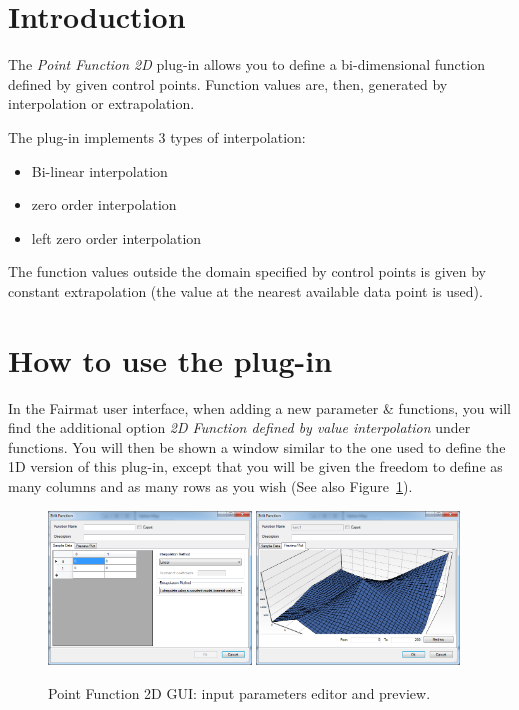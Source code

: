 \newcommand{\pluginName}{Point Function 2D}
\newcommand{\pluginVersion}{1.0.2}



\section{Introduction}
The \emph{Point Function 2D} plug-in allows you to define a bi-dimensional function defined by given control points. Function values are, then, generated by interpolation or extrapolation.

The plug-in implements 3 types of interpolation:
\begin{itemize}
\item Bi-linear interpolation
\item zero order interpolation
\item left zero order interpolation
\end{itemize}

The function values outside the domain specified by control points is given by constant extrapolation (the value at the nearest available data point is used).

\section{How to use the plug-in}
In the Fairmat user interface, when adding a new parameter \& functions, you will find the additional option \emph{2D Function defined by value interpolation} under functions.
You will then be shown a window similar to the one used to define the 1D version of this plug-in, except that you will be given the freedom to define as many columns and as many rows as you wish (See also Figure~\ref{fig.PFunction2DGUI}).

\begin{figure}[ht]
\begin{center}
\includegraphics[width=0.48\textwidth]{./images/PFunction2DEdit.png}
\includegraphics[width=0.48\textwidth]{./images/PFunction2DPreview.png}
\caption{Point Function 2D GUI: input parameters editor and preview.}
\label{fig.PFunction2DGUI}
\end{center}
\end{figure}

